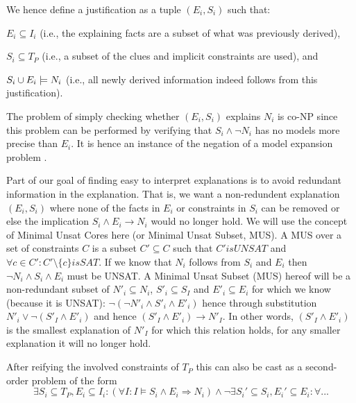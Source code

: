We hence define a justification as a tuple $(E_i,S_i)$ such that: 
\begin{compactitem}
	\item $E_i\subseteq I_i$ (i.e., the explaining facts are a subset of what was previously derived),
	\item $S_i \subseteq T_P$ (i.e., a subset of the clues and implicit constraints are used), and 
	\item $S_i \cup E_i \models N_i$ (i.e., all newly derived information indeed follows from this justification).
\end{compactitem}

The problem of simply checking whether $(E_i,S_i)$ explains $N_i$ is co-NP since this problem can be performed by verifying that $S_i \land \lnot N_i$ has no models more precise than $E_i$. It is hence an instance of the negation of a model expansion problem \cite{ternovskaMXcomplexity}.

Part of our goal of finding easy to interpret explanations is to avoid redundant information in the explanation. That is, we want a non-redundent explanation $(E_i,S_i)$ where none of the facts in $E_i$ or constraints in $S_i$ can be removed or else the implication $S_i \wedge E_i \rightarrow N_i$ would no longer hold. We will use the concept of Minimal Unsat Cores here (or Minimal Unsat Subset, MUS). A MUS over a set of constraints $C$ is a subset $C' \subseteq C$ such that $C' is UNSAT$ and $\forall c \in C': C' \setminus \{c\} is SAT$. If we know that $N_i$ follows from $S_i$ and $E_i$ then $\neg N_i \wedge S_i \wedge E_i$ must be UNSAT. A Minimal Unsat Subset (MUS) hereof will be a non-redundant subset of $N'_i \subseteq N_i$, $S'_i \subseteq S_I$ and $E'_i \subseteq E_i$ for which we know (because it is UNSAT): $\neg (\neg N'_i \wedge S'_i \wedge E'_i)$ hence through substitution $N'_i \vee \neg (S'_I \wedge E'_i)$ and hence $(S'_I \wedge E'_i) \rightarrow N'_I$. In other words, $(S'_I \wedge E'_i)$ is the smallest explanation of $N'_I$ for which this relation holds, for any smaller explanation it will no longer hold.

After reifying the involved constraints of $T_P$ this can also be cast as a second-order problem of the form
\[\exists S_i\subseteq T_P, E_i\subseteq I_i: (\forall I: I\models S_i\land E_i \Rightarrow N_i) \land \lnot \exists S_i'\subseteq S_i, E_i'\subseteq E_i: \forall ... \]

